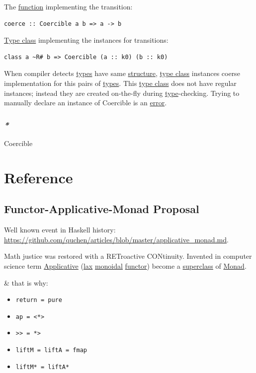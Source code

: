 \documentclass[a4paper,14pt,oneside]{book}
\begin{document}
The \hyperref[orgbd6b901]{function} implementing the transition:
\begin{verbatim}
coerce :: Coercible a b => a -> b
\end{verbatim}

\hyperref[org55753cc]{Type class} implementing the instances for transitions:
\begin{verbatim}
class a ~R# b => Coercible (a :: k0) (b :: k0)
\end{verbatim}
When compiler detects \hyperref[org3dcb7ed]{types} have same \hyperref[orge0f16dc]{structure}, \hyperref[org55753cc]{type class} instances coerse implementation for this pairs of \hyperref[org3dcb7ed]{types}. This \hyperref[org55753cc]{type class} does not have regular instances; instead they are created on-the-fly during \hyperref[orga8cd5bc]{type}-checking. Trying to manually declare an instance of Coercible is an \hyperref[org81f7c32]{error}.

\section{\emph{*}}
\label{sec:org2f1170d}

Coercible

\part{Reference}
\label{sec:orgf44ddce}

\chapter{\label{org4ea13d4}Functor-Applicative-Monad Proposal}
\label{sec:org516325f}
Well known event in Haskell history: \url{https://github.com/quchen/articles/blob/master/applicative\_monad.md}.

Math justice was restored with a RETroactive CONtinuity. Invented in computer science term \hyperref[org666a4e2]{Applicative} (\hyperref[org96a876d]{lax} \hyperref[org43be6d2]{monoidal} \hyperref[org09f34e9]{functor}) become a \hyperref[org89bc43a]{superclass} of \hyperref[orgf30f981]{Monad}.

\& that is why:
\begin{itemize}
\item \texttt{return = pure}
\item \texttt{ap = <*>}
\item \texttt{>> = *>}
\item \texttt{liftM = liftA = fmap}
\item \texttt{liftM* = liftA*}
\end{itemize}
\end{document}

